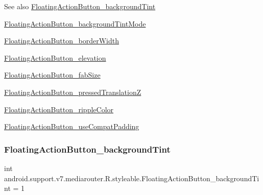 \begin{DoxySeeAlso}{See also}
\hyperlink{classandroid_1_1support_1_1v7_1_1mediarouter_1_1R_1_1styleable_aba6d8d43d6ae9315b2a7d8d808c39bdb}{Floating\+Action\+Button\+\_\+background\+Tint} 

\hyperlink{classandroid_1_1support_1_1v7_1_1mediarouter_1_1R_1_1styleable_a6dab3663758d5db831d0a3c6d4c3cfd0}{Floating\+Action\+Button\+\_\+background\+Tint\+Mode} 

\hyperlink{classandroid_1_1support_1_1v7_1_1mediarouter_1_1R_1_1styleable_a3062421234c87b23595c467fe125d6f8}{Floating\+Action\+Button\+\_\+border\+Width} 

\hyperlink{classandroid_1_1support_1_1v7_1_1mediarouter_1_1R_1_1styleable_a825fd6ef93b166b8df535e4b2bef49ba}{Floating\+Action\+Button\+\_\+elevation} 

\hyperlink{classandroid_1_1support_1_1v7_1_1mediarouter_1_1R_1_1styleable_abfd62dce09171db92b5473f46d12f11c}{Floating\+Action\+Button\+\_\+fab\+Size} 

\hyperlink{classandroid_1_1support_1_1v7_1_1mediarouter_1_1R_1_1styleable_aa52a7c21087dc6e360ad24e8b65e15ef}{Floating\+Action\+Button\+\_\+pressed\+TranslationZ} 

\hyperlink{classandroid_1_1support_1_1v7_1_1mediarouter_1_1R_1_1styleable_aa1f3b200711d78334f340170979ae709}{Floating\+Action\+Button\+\_\+ripple\+Color} 

\hyperlink{classandroid_1_1support_1_1v7_1_1mediarouter_1_1R_1_1styleable_ad73fa0b4b35d2b72943f9fd2e4122f9a}{Floating\+Action\+Button\+\_\+use\+Compat\+Padding} 
\end{DoxySeeAlso}
\mbox{\label{classandroid_1_1support_1_1v7_1_1mediarouter_1_1R_1_1styleable_aba6d8d43d6ae9315b2a7d8d808c39bdb}} 
\subsubsection{\texorpdfstring{Floating\+Action\+Button\+\_\+background\+Tint}{FloatingActionButton\_backgroundTint}}
{\footnotesize\ttfamily int android.\+support.\+v7.\+mediarouter.\+R.\+styleable.\+Floating\+Action\+Button\+\_\+background\+Tint = 1\hspace{0.3cm}{\ttfamily [static]}}

